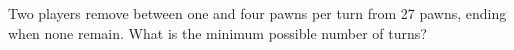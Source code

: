 Two players remove between one and four pawns per turn from 27 pawns, ending when none remain. What is the minimum possible number of turns?
